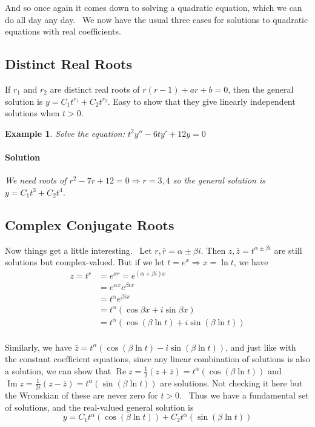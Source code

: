 \documentclass[letterpaper, 11pt, openany]{book}
\renewcommand{\Re}{\operatorname{Re}}
\renewcommand{\Im}{\operatorname{Im}}
\theoremstyle{mytheoremstyle}
\theoremstyle{myexamplestyle}
\newtheorem{example}{Example}[section]
\newenvironment{solution}{\paragraph{\sffamily \smaller \fontseries{b}\selectfont Solution}}{\hfill\faSquare}
\begin{document}
And so once again it comes down to solving a quadratic equation, which we can do all day any day. \faLaugh \ We now have the usual three cases for solutions to quadratic equations with real coefficients.

\subsection{Distinct Real Roots}
If \(r_1\) and \(r_2\) are distinct real roots of \(r(r-1) + ar + b =0\), then the general solution is \(y = C_1 t^{r_1} + C_2 t^{r_2}\). Easy to show that they give linearly independent solutions when \(t > 0\).

\begin{example}
    Solve the equation: \(t^2y'' - 6ty' + 12y = 0\)
    \begin{solution}
        We need roots of \(r^2 -7r + 12 = 0 \Rightarrow r = 3, 4\) so the general solution is \(y = C_1 t^3 + C_2 t^4\).
    \end{solution}
\end{example}

\subsection{Complex Conjugate Roots}
Now things get a little interesting. \faGrin \ Let \(r, \bar{r} = \alpha \pm \beta i\). Then \(z, \bar{z} = t^{\alpha \pm \beta i}\) are still solutions but complex-valued. But if we let \(t = e^x \Rightarrow x = \ln t\), we have
\begin{align*}
    z = t^r &= e^{xr} = e^{(\alpha + \beta i)x}\\
    &= e^{\alpha x} e^{\beta i x}\\
    &= t^\alpha e^{\beta i x}\\
    &= t^\alpha \left(\cos \beta x + i \sin \beta x\right)\\
    &= t^\alpha \left(\cos \left(\beta \ln t\right) + i \sin \left(\beta \ln t\right)\right)\\
\end{align*}

Similarly, we have \(\bar{z} = t^\alpha \left(\cos \left(\beta \ln t\right) - i \sin \left(\beta \ln t\right)\right)\), and just like with the constant coefficient equations, since any linear combination of solutions is also a solution, we can show that \(\Re z = \frac{1}{2}(z + \bar{z}) = t^\alpha \left(\cos \left(\beta \ln t\right)\right)\) and \(\Im z = \frac{1}{2i}\left(z - \bar{z}\right) = t^\alpha\left(\sin \left(\beta \ln t\right)\right)\) are solutions. Not checking it here but the Wronskian of these are never zero for \(t > 0\). \faLaughWink \ Thus we have a fundamental set of solutions, and the real-valued general solution is
\[y = C_1 t^\alpha \left(\cos \left(\beta \ln t\right)\right) + C_2 t^\alpha \left(\sin \left(\beta \ln t\right)\right)\]
\end{document}
